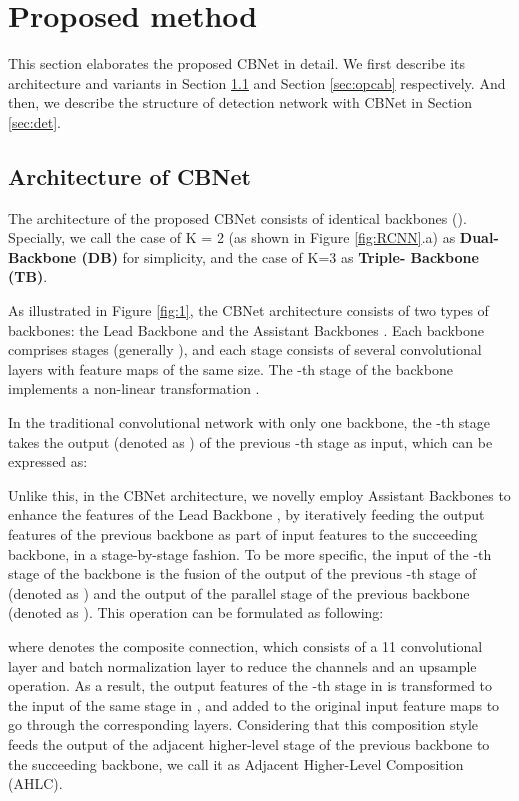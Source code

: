 \documentclass[letterpaper]{article} \usepackage{aaai20}  \usepackage{multirow}
\begin{document}
\section{Proposed method}
\label{section 3}
This section elaborates the proposed CBNet in detail. We first describe its architecture and variants in Section \ref{sec:arc} and Section \ref{sec:opcab} respectively. And then, we describe the structure of detection network with CBNet in Section \ref{sec:det}.


\subsection{Architecture of CBNet}
\label{sec:arc}

The architecture of the proposed CBNet consists of  identical backbones (). Specially, we call the case of K = 2 (as shown in Figure \ref{fig:RCNN}.a) as \textbf{Dual-Backbone (DB)} for simplicity, and the case of K=3 as \textbf{Triple- Backbone (TB)}.

As illustrated in Figure \ref{fig:1}, the CBNet architecture consists of two types of backbones: the Lead Backbone  and the Assistant Backbones . Each backbone comprises  stages (generally ), and each stage consists of several convolutional layers with feature maps of the same size. The -th stage of the backbone implements a non-linear transformation .

In the traditional convolutional network with only one backbone, the -th stage takes the output (denoted as ) of the previous -th stage as input, which can be expressed as:

Unlike this, in the CBNet architecture, we novelly employ Assistant Backbones  to enhance the features of the Lead Backbone , by iteratively feeding the output features of the previous backbone as part of input features to the succeeding backbone, in a stage-by-stage fashion. To be more specific, the input of the -th stage of the backbone  is the fusion of the output of the previous -th stage of  (denoted as ) and the output of the parallel stage of the previous backbone  (denoted as ). This operation can be formulated as following:


where  denotes the composite connection, which consists of a 11 convolutional layer and batch normalization layer to reduce the channels and an upsample operation. As a result, the output features of the -th stage in  is transformed to the input of the same stage in , and added to the original input feature maps to go through the corresponding layers. Considering that this composition style feeds the output of the adjacent higher-level stage of the previous backbone to the succeeding backbone, we call it as Adjacent Higher-Level Composition (AHLC).
\end{document}
